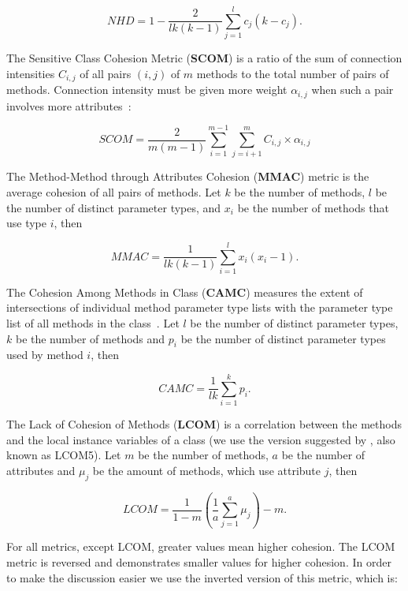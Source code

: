\documentclass[conference]{IEEEtran}
\begin{document}
\begin{equation}
\mathit{NHD} = 1 - \frac{2}{lk(k-1)} \sum_{j=1}^{l} c_j(k-c_j).
\end{equation}

The Sensitive Class Cohesion Metric (\textbf{SCOM}) is a
ratio of the sum of connection intensities $C_{i,j}$ of
all pairs $(i,j)$ of $m$ methods to the total number of pairs of methods.
Connection intensity must be given more weight $\alpha_{i,j}$ when such a
pair involves more attributes~\cite{fernandez06}:

\begin{equation}
\mathit{SCOM} = \frac{2}{m(m-1)} \sum_{i=1}^{m-1} \sum_{j=i+1}^{m} C_{i,j} \times \alpha_{i,j}
\end{equation}

The Method-Method through Attributes Cohesion (\textbf{MMAC}) metric is
the average cohesion of all pairs of methods\cite{dallal07}.
Let $k$ be the number of methods, $l$ be the number of distinct parameter types,
and $x_i$ be the number of methods that use type $i$, then

\begin{equation}
\mathit{MMAC} = \frac{1}{lk(k-1)} \displaystyle\sum_{i=1}^{l} x_i (x_i - 1).
\end{equation}

The Cohesion Among Methods in Class (\textbf{CAMC})
measures the extent of intersections of individual method parameter
type lists with the parameter type list of all methods in the class~\cite{bansiya99}.
Let $l$ be the number of distinct parameter types, $k$ be the number
of methods and $p_i$ be the number of distinct parameter
types used by method $i$, then

\begin{equation}
\mathit{CAMC} = \frac{1}{lk} \sum_{i=1}^{k} p_i.
\end{equation}

The Lack of Cohesion of Methods (\textbf{LCOM}) is
a correlation between the methods and the local instance variables of a class
(we use the version suggested by \cite{henderson96}, also known as LCOM5).
Let $m$ be the number of methods, $a$ be the number of
attributes and $\mu_j$ be the amount of methods, which use attribute $j$, then

\begin{equation}
\mathit{LCOM} = \frac{1}{1 - m} \left( \dfrac{1}{a} \displaystyle\sum_{j=1}^{a} \mu_j \right) - m.
\end{equation}

For all metrics, except LCOM, greater values mean higher cohesion. The LCOM
metric is reversed and demonstrates smaller values for higher cohesion. In order
to make the discussion easier we use the inverted version of this metric,
which is:
\end{document}
